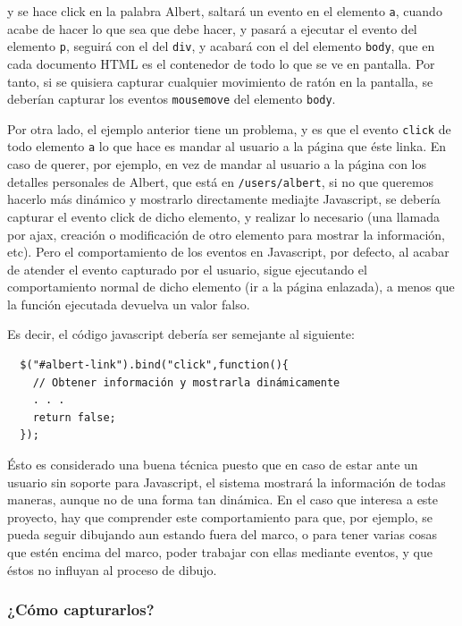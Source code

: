 y se hace click en la palabra Albert, saltará un evento en el elemento \texttt{a}, cuando acabe de hacer lo que sea que debe hacer, y pasará a ejecutar el evento del elemento \texttt{p}, seguirá con el del \texttt{div}, y acabará con el del elemento \texttt{body}, que en cada documento HTML es el contenedor de todo lo que se ve en pantalla. Por tanto, si se quisiera capturar cualquier movimiento de ratón en la pantalla, se deberían capturar los eventos \texttt{mousemove} del elemento \texttt{body}.

Por otra lado, el ejemplo anterior tiene un problema, y es que el evento \texttt{click} de todo elemento \texttt{a} lo que hace es mandar al usuario a la página que éste linka. En caso de querer, por ejemplo, en vez de mandar al usuario a la página con los detalles personales de Albert, que está en \texttt{/users/albert}, si no que queremos hacerlo más dinámico y mostrarlo directamente mediajte Javascript, se debería capturar el evento click de dicho elemento, y realizar lo necesario (una llamada por ajax, creación o modificación de otro elemento para mostrar la información, etc). Pero el comportamiento de los eventos en Javascript, por defecto, al acabar de atender el evento capturado por el usuario, sigue ejecutando el comportamiento normal de dicho elemento (ir a la página enlazada), a menos que la función ejecutada devuelva un valor falso.

Es decir, el código javascript debería ser semejante al siguiente:
\begin{verbatim}
  $("#albert-link").bind("click",function(){
    // Obtener información y mostrarla dinámicamente
    . . .
    return false;
  });
\end{verbatim}

Ésto es considerado una buena técnica puesto que en caso de estar ante un usuario sin soporte para Javascript, el sistema mostrará la información de todas maneras, aunque no de una forma tan dinámica. En el caso que interesa a este proyecto, hay que comprender este comportamiento para que, por ejemplo, se pueda seguir dibujando aun estando fuera del marco, o para tener varias cosas que estén encima del marco, poder trabajar con ellas mediante eventos, y que éstos no influyan al proceso de dibujo.


\subsubsection{¿Cómo capturarlos?} %
\label{ssub:como_capturarlos}

